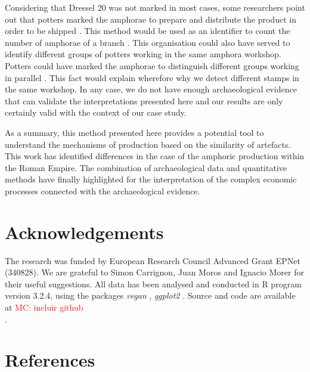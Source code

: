\documentclass[review]{elsarticle}
\newcommand{\memo}[2]{\textcolor{#1}{#2}}
\newcommand{\maria}[1]{\memo{red}{MC: #1\\}}
\begin{document}
Considering that Dressel 20 was not marked in most cases, some researchers point out that potters marked the amphorae to prepare and distribute the product in order to be shipped \citep{berni_millet_epigrafianforica_2008}. This method would be used as an identifier to count the number of amphorae of a branch \citep{juanmorostesis}. This organisation could also have served to identify different groups of potters working in the same amphora workshop. Potters could have marked the amphorae to distinguish different groups working in parallel \citep{li_crossbows_2014}. This fact would explain wherefore why we detect different stamps in the same workshop. In any case, we do not have enough archaeological evidence that can validate the interpretations presented here and our results are only certainly valid with the context of our case study. 

As a summary, this method presented here provides a potential tool to understand the mechanisms of production based on the similarity of artefacts. This work has identified differences in the case of the amphoric production within the Roman Empire. The combination of archaeological data and quantitative methods have finally highlighted for the interpretation of the complex economic processes connected with the archaeological evidence. 


\section{Acknowledgements}

The research was funded by European Research Council Advanced Grant EPNet (340828). We are grateful to Simon Carrignon, Juan Moros and Ignacio Morer for their useful suggestions.  
All data has been analysed and conducted in R program version 3.2.4, using the packages \textit{vegan} \citep{oksanen_vegan_2007}, \textit{ggplot2} \citep{ggplot2:_2016}. Source and code are available at \maria{incluir github}. 


\section{References}

%

\end{document}
